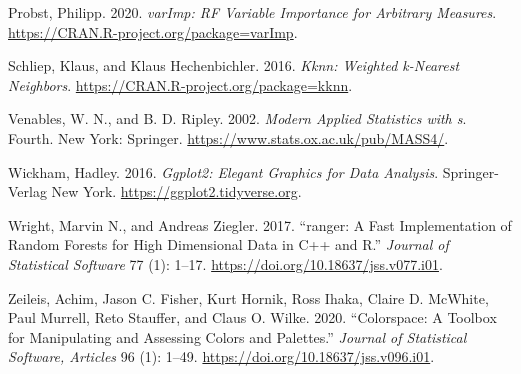 \begin{CSLReferences}{1}{0}
\leavevmode{}%
Probst, Philipp. 2020. \emph{varImp: {RF} {V}ariable {I}mportance for {A}rbitrary {M}easures}. \url{https://CRAN.R-project.org/package=varImp}.

\leavevmode{}%
Schliep, Klaus, and Klaus Hechenbichler. 2016. \emph{Kknn: Weighted k-Nearest Neighbors}. \url{https://CRAN.R-project.org/package=kknn}.

\leavevmode{}%
Venables, W. N., and B. D. Ripley. 2002. \emph{Modern Applied Statistics with s}. Fourth. New York: Springer. \url{https://www.stats.ox.ac.uk/pub/MASS4/}.

\leavevmode{}%
Wickham, Hadley. 2016. \emph{Ggplot2: Elegant Graphics for Data Analysis}. Springer-Verlag New York. \url{https://ggplot2.tidyverse.org}.

\leavevmode{}%
Wright, Marvin N., and Andreas Ziegler. 2017. {``{ranger}: A Fast Implementation of Random Forests for High Dimensional Data in {C++} and {R}.''} \emph{Journal of Statistical Software} 77 (1): 1--17. \url{https://doi.org/10.18637/jss.v077.i01}.

\leavevmode{}%
Zeileis, Achim, Jason C. Fisher, Kurt Hornik, Ross Ihaka, Claire D. McWhite, Paul Murrell, Reto Stauffer, and Claus O. Wilke. 2020. {``Colorspace: A Toolbox for Manipulating and Assessing Colors and Palettes.''} \emph{Journal of Statistical Software, Articles} 96 (1): 1--49. \url{https://doi.org/10.18637/jss.v096.i01}.

\end{CSLReferences}



\address{%
Alan Inglis\\
Maynooth University\\%
Department of Mathematics and Statistics\\ Maynooth, Ireland\\
%
%
\textit{ORCiD: \href{https://orcid.org/0000-0002-1151-6657}{0000-0002-1151-6657}}\\%
\href{mailto:alan.inglis@mu.ie}{\nolinkurl{alan.inglis@mu.ie}}%
}

\address{%
Andrew Parnell\\
Maynooth University\\%
Hamilton Institute\\ Maynooth, Ireland\\
%
%
\textit{ORCiD: \href{https://orcid.org/0000-0001-7956-7939}{0000-0001-7956-7939}}\\%
\href{mailto:andrew.parnell@mu.ie}{\nolinkurl{andrew.parnell@mu.ie}}%
}

\address{%
Catherine Hurley\\
Maynooth University\\%
Department of Mathematics and Statistics\\ Maynooth, Ireland\\
%
%
\textit{ORCiD: \href{https://orcid.org/0000-0003-2758-5531}{0000-0003-2758-5531}}\\%
\href{mailto:catherine.hurley@mu.ie}{\nolinkurl{catherine.hurley@mu.ie}}%
}
